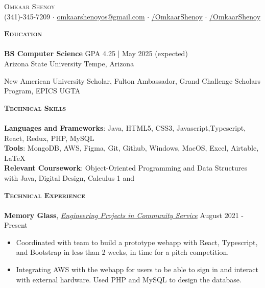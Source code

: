 \documentclass[a4paper]{article}
\newcommand{\lineunder} {
    \vspace*{-8pt} \\
    \hspace*{-18pt} \hrulefill \\
}
\newcommand{\header} [1] {
    {\hspace*{-15pt}\vspace*{3pt} \textsc{#1}}
    \vspace*{-6pt} \lineunder
}
\begin{document}
\vspace*{-30.9pt}



{\begin{center}
	{\Huge \scshape {Omkaar Shenoy}}\\
	\vspace{2mm}
	\faPhone  \hspace{0.5mm} (341)-345-7209 $\cdot$ \href{mailto:omkaarshenoyos@gmail.com}{\faEnvelope \hspace{0.5mm} omkaarshenoyos@gmail.com} \hspace{0.5mm}   $\cdot$ \href{https://www.linkedin.com/in/OmkaarShenoy/}{\faLinkedin/OmkaarShenoy} $\cdot$ \href{https://github.com/OmkaarShenoy}{\faGithub/OmkaarShenoy}
	
\end{center}


    \header{\textbf{Education}}

    \textbf{BS Computer Science} \hfill GPA 4.25 | May 2025 (expected)
\\ Arizona State University \hfill Tempe, Arizona
 
New American University Scholar, Fulton Ambassador, Grand Challenge Scholars Program, EPICS UGTA\\


\vspace{1mm}

\header{\textbf{Technical Skills}}

\textbf{Languages and Frameworks}: Java, HTML5, CSS3, Javascript,Typescript, React, Redux, PHP, MySQL \\
\textbf{Tools}: MongoDB, AWS, Figma, Git, Github, Windows, MacOS, Excel, Airtable, \LaTeX \\
\textbf{Relevant Coursework}: Object-Oriented Programming and Data Structures with Java, Digital Design, Calculus 1 and \\
\vspace{1mm}


\header{\textbf{Technical Experience}}
\textbf{Memory Glass},  \href{https://epics.engineering.asu.edu/}{\textit{Engineering Projects in Community Service}} \faExternalLink
\hfill August 2021 - Present\\
\vspace{-3mm}
\begin{itemize}
    \item Coordinated with team to build a prototype webapp with React, Typescript, and Bootstrap in less than 2 weeks, in time for a pitch competition. 
    \item Integrating AWS with the webapp for users to be able to sign in and interact with external hardware. Used PHP and MySQL to design the database. 
    

\end{itemize}}
\end{document}
